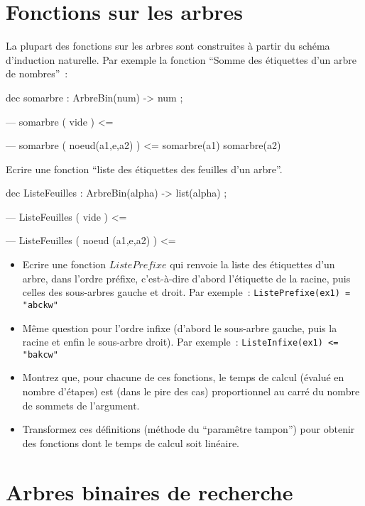 \section{Fonctions sur les arbres}

La plupart des fonctions sur les arbres sont construites à partir du
schéma d'induction naturelle. Par exemple la fonction ``Somme des
étiquettes d'un arbre de nombres''~:
\begin{verbatimtab}
dec somarbre : ArbreBin(num) -> num ;
	
--- somarbre ( vide ) 	<= 

--- somarbre ( noeud(a1,e,a2) )  <= 	somarbre(a1)		somarbre(a2)
\end{verbatimtab}

\begin{exercice}
Ecrire une fonction ``liste des étiquettes des feuilles d'un arbre''.
\begin{verbatimtab}
dec ListeFeuilles : ArbreBin(alpha) -> list(alpha) ;

--- ListeFeuilles ( vide )  <=

--- ListeFeuilles ( noeud (a1,e,a2) ) <= 

\end{verbatimtab}
\end{exercice}

\begin{exercice}

\begin{itemize}
\item Ecrire une fonction $ListePrefixe$ qui renvoie la liste des
étiquettes d'un arbre, dans l'ordre préfixe, c'est-à-dire d'abord
l'étiquette de la racine, puis celles des sous-arbres gauche et
droit. Par exemple~: \verb+ListePrefixe(ex1) = "abckw"+
\item
M\^eme question pour l'ordre infixe (d'abord le sous-arbre gauche,
puis la racine et enfin le sous-arbre droit). Par exemple~:
\verb+ListeInfixe(ex1) <= "bakcw"+
\item Montrez que, pour chacune de ces fonctions, le temps de calcul (évalué
en nombre d'étapes) est (dans le pire des cas) proportionnel au carré
du nombre de sommets de l'argument.
\item
Transformez ces définitions (méthode du ``param\^etre tampon'') pour obtenir des fonctions dont le temps de calcul soit linéaire.
\end{itemize}
\end{exercice}

\section{Arbres binaires de recherche}


